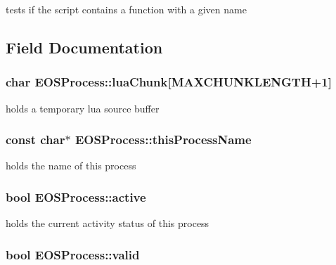 tests if the script contains a function with a given name 



\subsection{Field Documentation}
\hypertarget{classEOSProcess_318b6a6c7ab85ac4b9ecad280cd3fe5d}{
\subsubsection[{luaChunk}]{\setlength{\rightskip}{0pt plus 5cm}char {\bf EOSProcess::luaChunk}\mbox{[}MAXCHUNKLENGTH+1\mbox{]}}}
\label{classEOSProcess_318b6a6c7ab85ac4b9ecad280cd3fe5d}


holds a temporary lua source buffer 

\hypertarget{classEOSProcess_19fe017cf86629e8783b745e5f88a5a7}{
\subsubsection[{thisProcessName}]{\setlength{\rightskip}{0pt plus 5cm}const char$\ast$ {\bf EOSProcess::thisProcessName}}}
\label{classEOSProcess_19fe017cf86629e8783b745e5f88a5a7}


holds the name of this process 

\hypertarget{classEOSProcess_223622c13ea24b06079078ac0910925f}{
\subsubsection[{active}]{\setlength{\rightskip}{0pt plus 5cm}bool {\bf EOSProcess::active}}}
\label{classEOSProcess_223622c13ea24b06079078ac0910925f}


holds the current activity status of this process 

\hypertarget{classEOSProcess_69b4f5d326f9fbbda1ddad22b42f80b9}{
\subsubsection[{valid}]{\setlength{\rightskip}{0pt plus 5cm}bool {\bf EOSProcess::valid}}}
\label{classEOSProcess_69b4f5d326f9fbbda1ddad22b42f80b9}


